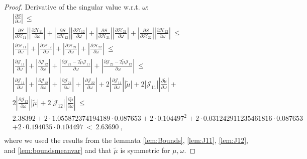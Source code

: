 \documentclass{article}
\newcommand\munn{{\tilde \mu}}
\renewcommand{\leq}{\leqslant}
\begin{document}
\begin{proof}
Derivative of the singular value w.r.t. $\omega$:
\begin{align}
&\left|\frac{\partial S}{\partial \omega}\right| \ \leq \\\nonumber
&\left|\frac{\partial S}{\partial {\mathcal H}_{11}}\right| \left|\frac{\partial {\mathcal H}_{11}}{\partial \omega}\right| + 
 \left| \frac{\partial S}{\partial {\mathcal H}_{12}}\right| \left|\frac{\partial {\mathcal H}_{12}}{\partial \omega}\right| + 
 \left|\frac{\partial S}{\partial {\mathcal H}_{21}}\right| \left|\frac{\partial {\mathcal H}_{21}}{\partial \omega}\right| + 
 \left| \frac{\partial S}{\partial {\mathcal H}_{22}}\right| \left|\frac{\partial {\mathcal H}_{22}}{\partial \omega}\right|
\ \leq \\\nonumber
&\left|\frac{\partial {\mathcal H}_{11}}{\partial \omega}\right| + 
\left|\frac{\partial {\mathcal H}_{12}}{\partial \omega} \right| + 
\left|\frac{\partial {\mathcal H}_{21}}{\partial \omega} \right|+ 
\left|\frac{\partial {\mathcal H}_{22}}{\partial \omega}\right|
\ \leq \\\nonumber
&\left|\frac{\partial {\mathcal J}_{11}}{\partial \omega}\right| + 
\left|\frac{\partial {\mathcal J}_{12}}{\partial \omega} \right| + 
\left|\frac{\partial {\mathcal J}_{21} - 2 \munn {\mathcal J}_{11}}{\partial \omega} \right|+ 
\left|\frac{\partial {\mathcal J}_{22} - 2 \munn {\mathcal J}_{12}}{\partial \omega}\right|
\ \leq \\\nonumber
&\left|\frac{\partial {\mathcal J}_{11}}{\partial \omega}\right| + 
\left|\frac{\partial {\mathcal J}_{12}}{\partial \omega} \right| + 
\left|\frac{\partial {\mathcal J}_{21}}{\partial \omega} \right|+ 
\left|\frac{\partial {\mathcal J}_{22}}{\partial \omega}\right| +
2 \left|\frac{\partial {\mathcal J}_{11}}{\partial \omega}\right| \left| \munn\right|  + 2 \left| \mathcal{J}_{11} \right| \left| \frac{\partial \munn}{\partial \omega}\right| + \nonumber \\
& \left. 2 \left|\frac{\partial {\mathcal J}_{12}}{\partial \omega}\right| \left| \munn\right|  + 2 \left| \mathcal{J}_{12} \right| \left| \frac{\partial \munn}{\partial \omega}\right| \right.
\ \leq \\\nonumber
& 2.38392 + 2\cdot 1.055872374194189 \cdot 0.087653 + 2 \cdot 0.104497^2 + 2\cdot 0.031242911235461816 \cdot 0.087653 \\ \nonumber
& + 2\cdot 0.194035 \cdot 0.104497\ <\ 2.63690 \ , \\\nonumber
\end{align}
where we used the results from the lemmata \ref{lem:Bounds}, \ref{lem:J11}, \ref{lem:J12}, and \ref{lem:boundsmeanvar} and that
$\munn$ is symmetric for $\mu, \omega$.


\end{proof}
\end{document}

